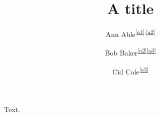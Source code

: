 \documentclass{amsart}
\begin{document}
\title{A title}
\author{Ann Able\textsuperscript{\ref{a1},\ref{a2}}}
\address{\label{a1}University X, Town}
\author{Bob Baker\textsuperscript{\ref{a2}\ref{a3}}}
\address{\label{a2}University Y, City}
\author{Cid Cole\textsuperscript{\ref{a3}}}
\address{\label{a3}University Z, Village}
\maketitle
Text.
\end{document}
